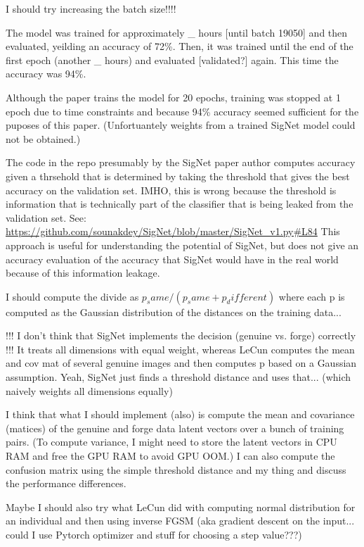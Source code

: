 I should try increasing the batch size!!!!

The model was trained for approximately \_ hours [until batch 19050] and then evaluated, yeilding an accuracy of 72\%.
Then, it was trained until the end of the first epoch (another \_ hours) and evaluated [validated?] again.
This time the accuracy was 94\%.

Although the paper trains the model for 20 epochs, training was stopped at 1 epoch due to time constraints and because 94\% accuracy seemed sufficient for the puposes of this paper.
(Unfortuantely weights from a trained SigNet model could not be obtained.)

The code in the repo presumably by the SigNet paper author computes accuracy given a thrsehold that is determined by taking the threshold that gives the best accuracy on the validation set.
IMHO, this is wrong because the threshold is information that is technically part of the classifier that is being leaked from the validation set.
See: \url{https://github.com/sounakdey/SigNet/blob/master/SigNet_v1.py#L84}
This approach is useful for understanding the potential of SigNet, but does not give an accuracy evaluation of the accuracy that SigNet would have in the real world because of this information leakage.


I should compute the divide as $p_same / (p_same + p_different)$ where each p is computed as the Gaussian distribution of the distances on the training data...

!!! I don't think that SigNet implements the decision (genuine vs. forge) correctly !!!
It treats all dimensions with equal weight, whereas LeCun computes the mean and cov mat of several genuine images and then computes p based on a Gaussian assumption.
Yeah, SigNet just finds a threshold distance and uses that... (which naively weights all dimensions equally)

I think that what I should implement (also) is compute the mean and covariance (matices) of the genuine and forge data latent vectors over a bunch of training pairs. (To compute variance, I might need to store the latent vectors in CPU RAM and free the GPU RAM to avoid GPU OOM.)
I can also compute the confusion matrix using the simple threshold distance and my thing and discuss the performance differences.

Maybe I should also try what LeCun did with computing normal distribution for an individual and then using inverse FGSM (aka gradient descent on the input... could I use Pytorch optimizer and stuff for choosing a step value???)


